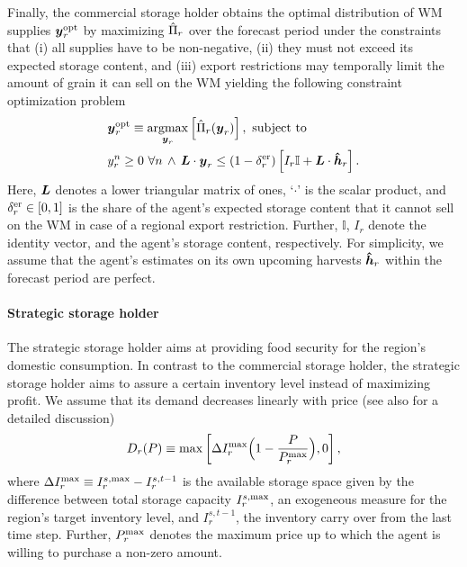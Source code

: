 Finally, the commercial storage holder obtains the optimal distribution of WM supplies $\boldsymbol y_r^{\operatorname{opt}}$ by
maximizing $\hat{\Pi}_r$ over the forecast period under the constraints that (i) all supplies have to be
non-negative, (ii) they must not exceed its expected storage content, and (iii) export restrictions
may temporally limit the amount of grain it can sell on the WM yielding the following constraint
optimization problem
\begin{subequations}
\label{eq:yopt}
\begin{align}
  &\boldsymbol y_r^{\operatorname{opt}} \equiv \underset{\boldsymbol y_r}{\operatorname{argmax}}\left[\hat{\Pi}_r(\boldsymbol y_r)\right],\text{ subject to}\\
  &y_r^n \geq 0\,\, \forall n\,\wedge\, \boldsymbol L\cdot \boldsymbol y_r \leq (1-\delta^{\operatorname{er}}_r)\left[I_r\mathbb{I} + \boldsymbol L \cdot\boldsymbol {\hat{h}}_r\right]\label{subeq:capac_constraint}.
\end{align}
\end{subequations}
Here, $\boldsymbol L$ denotes a lower triangular matrix of ones, `$\cdot$' is the scalar product, and
$\delta^{\operatorname{er}}_r\in[0,1]$ is the share of the agent's expected storage content that it cannot sell on the WM
in case of a regional export restriction. Further, $\mathbb{I}$, $I_r$ denote the identity vector,
and the agent's storage content, respectively. For simplicity, we assume that the agent's estimates
on its own upcoming harvests $\boldsymbol {\hat{h}}_r$ within the forecast period are perfect.

\paragraph*{Strategic storage holder}
The strategic storage holder aims at providing food security for the region's domestic
consumption. In contrast to the commercial storage holder, the strategic storage holder aims to
assure a certain inventory level instead of maximizing profit. We assume that its demand decreases
linearly with price (see also \cite{SCH17} for a detailed discussion)
\begin{equation}
  \label{eq:D_r}
  D_r(P)\equiv\max\left[\Delta I^{\operatorname{max}}_r\Big(1 - \frac{P}{P^{\operatorname{max}}_r}\Big),0\right],
\end{equation}
where $\Delta I^{\operatorname{max}}_r\equiv I^{s,\operatorname{max}}_r - I_r^{s,t-1}$ is the available storage space given by the difference
between total storage capacity $I^{s,\operatorname{max}}_r$, an exogeneous measure for the region's target inventory
level, and $I_r^{s,t-1}$, the inventory carry over from the last time step. Further, $P^{\operatorname{max}}_r$
denotes the maximum price up to which the agent is willing to purchase a non-zero amount.

